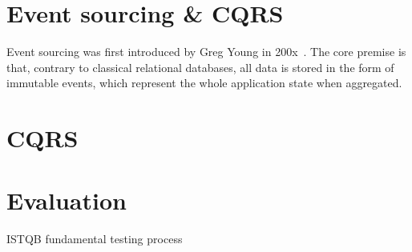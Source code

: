 \section{Event sourcing \& CQRS}
\label{sec:fundamentals:event}

Event sourcing was first introduced by Greg Young in 200x~\cite{source/link}.
The core premise is that, contrary to classical relational databases, all data is stored in the form of immutable events, which represent the whole application state when aggregated.


\cite{WEB:Fowler:2005}

\cite{WEB:Fowler:2011}

\section{CQRS}
\label{sec:fundamentals:CQRS}

\section{Evaluation}
\label{sec:fundamentals:evaluation}

ISTQB fundamental testing process~\cite{graham2008foundations}

